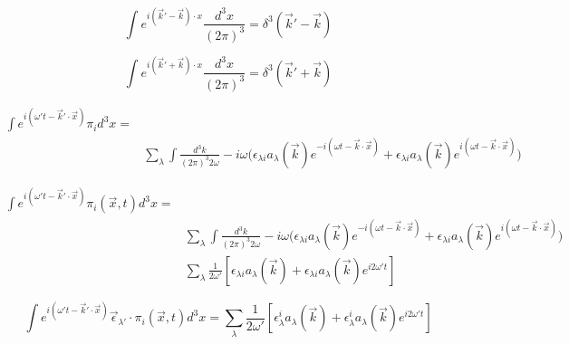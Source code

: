 \documentclass[a4]{article}
\begin{document}
    \begin{equation} %
        \int e^{i (\vec{k}' - \vec{k}) \cdot x} \frac{d^{3} x}{(2 \pi)^{3}} = \delta^{3} (\vec{k}' - \vec{k})
    \end{equation}

    \begin{equation} %
        \int e^{i (\vec{k}' + \vec{k}) \cdot x} \frac{d^{3} x}{(2 \pi)^{3}} = \delta^{3} (\vec{k}' + \vec{k})
    \end{equation}

    \begin{equation} %
        \begin{aligned}
            \int e^{i (\omega' t - \vec{k}' \cdot \vec{x})} \pi_{i} d^{3} x = & \\
            & \sum_{\lambda} \int \frac{d^{3} k}{(2 \pi)^{3} 2 \omega} - i \omega \bigg( \epsilon_{\lambda i} a_{\lambda} (\vec{k}) e^{- i (\omega t - \vec{k} \cdot \vec{x})} + \epsilon_{\lambda i} a_{\lambda} (\vec{k}) e^{i (\omega t - \vec{k} \cdot \vec{x})} \bigg)
        \end{aligned}
    \end{equation}

    \begin{equation} %
        \begin{aligned}
            \int e^{i (\omega' t - \vec{k}' \cdot \vec{x})} \pi_{i} (\vec{x}, t) d^{3} x = & \\
            & \sum_{\lambda} \int \frac{d^{3} k}{(2 \pi)^{3} 2 \omega} - i \omega \bigg( \epsilon_{\lambda i} a_{\lambda} (\vec{k}) e^{- i (\omega t - \vec{k} \cdot \vec{x})} + \epsilon_{\lambda i} a_{\lambda} (\vec{k}) e^{i (\omega t - \vec{k} \cdot \vec{x})} \bigg) \\
            & \sum_{\lambda} \frac{1}{2 \omega'} [\epsilon_{\lambda i} a_{\lambda} (\vec{k}) + \epsilon_{\lambda i} a_{\lambda} (\vec{k}) e^{i2 \omega' t}]
        \end{aligned}
    \end{equation}

    \begin{equation} %
        \int e^{i (\omega' t - \vec{k}' \cdot \vec{x})} \vec{\epsilon}_{\lambda'} \cdot \pi_{i} (\vec{x}, t) d^3 x = \sum_{\lambda} \frac{1}{2 \omega'} [\epsilon_{\lambda}^{i} a_{\lambda} (\vec{k}) + \epsilon_{\lambda}^{i} a_{\lambda} (\vec{k}) e^{i2 \omega' t}]
    \end{equation}
\end{document}

